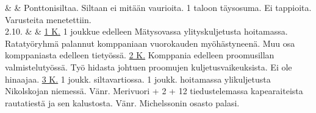 \documentclass[11pt,a5paper,oneside]{book}
\begin{document}
\newpage

& & Ponttonisiltaa. Siltaan ei mitään vaurioita. 1 taloon täysosuma. Ei tappioita. Varusteita menetettiin. \newline\newline\newline \\

2.10. & & \underline{1 K.} 1 joukkue edelleen Mätysovassa ylityskuljetusta hoitamassa. Ratatyöryhmä palannut komppaniaan vuorokauden myöhästyneenä. Muu osa komppaniasta edelleen tietyössä. \newline\newline \underline{2 K.} Komppania edelleen proomusillan valmistelutyössä. Työ hidasta johtuen proomujen kuljetusvaikeuksista. Ei ole hinaajaa. \newline\newline \underline{3 K.} 1 joukk. siltavartiossa. 1 joukk. hoitamassa ylikuljetusta Nikolskojan niemessä. Vänr. Merivuori + 2 + 12 tiedustelemassa kapearaiteista rautatiestä ja sen kalustosta. Vänr. Michelssonin osasto palasi. \\

\taulustop

\end{document}

